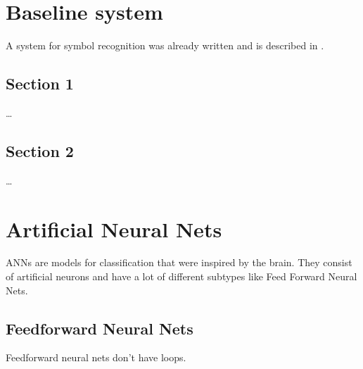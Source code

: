 
\chapter{Baseline system} %
\label{ch:Content1}

A system for symbol recognition was already written and is described in \cite{Kirsch}.


\section{Section 1}
\label{ch:Content1:sec:Section1}

\dots


\section{Section 2}
\label{ch:Content1:sec:Section2}

\dots



\chapter{Artificial Neural Nets}
\label{ch:Content2}

\Glspl{ANN} are models for classification that were inspired by the brain.
They consist of artificial neurons and have a lot of different subtypes like
Feed Forward Neural Nets.




\section{Feedforward Neural Nets}
\label{ch:Content2:sec:Section2}

Feedforward neural nets don't have loops.

